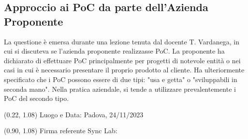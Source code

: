 \documentclass{article}
\begin{document}
    \subsection{Approccio ai PoC da parte dell'Azienda Proponente}
    La questione è emersa durante una lezione tenuta dal docente T. Vardanega, in cui si discuteva se l'azienda proponente realizzasse PoC. La proponente ha dichiarato di effettuare PoC principalmente per progetti di notevole entità o nei casi in cui è necessario presentare il proprio prodotto al cliente. 
    Ha ulteriormente specificato che i PoC possono essere di due tipi: "usa e getta" o "sviluppabili in seconda mano".
    Nella pratica aziendale, si tende a utilizzare prevalentemente i PoC del secondo tipo.
\begin{textblock*}{\textwidth}(0.22\textwidth, 1.08\textheight)
    Luogo e Data: Padova, 24/11/2023
\end{textblock*}

\begin{textblock*}{\textwidth}(0.90\textwidth, 1.08\textheight)
        Firma referente Sync Lab:
\end{textblock*}
\end{document}
